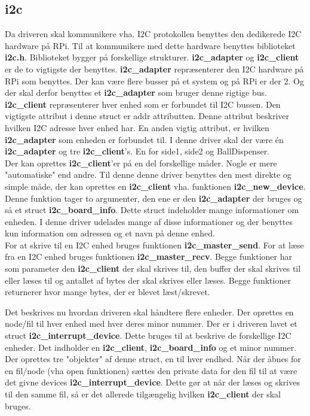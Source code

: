 \documentclass[Softwaredesign/Softwaredesign_main.tex]{subfiles}
\begin{document}
\subsection{i2c}
Da driveren skal kommunikere vha. I2C protokollen benyttes den dedikerede I2C hardware på RPi. Til at kommunikere med dette hardware benyttes biblioteket \textbf{i2c.h}. Biblioteket bygger på forskellige strukturer. \textbf{i2c\_adapter} og\textbf{ i2c\_client} er de to vigtigste der benyttes. 
\textbf{i2c\_adapter} repræsenterer den I2C hardware på RPi som benyttes. Der kan være flere busser på et system og på RPi er der 2. Og der skal derfor benyttes et \textbf{i2c\_adapter} som bruger denne rigtige bus. 
\textbf{i2c\_client} repræsenterer hver enhed som er forbundet til I2C bussen. Den vigtigste attribut i denne struct er addr attributten. Denne attribut beskriver hvilken I2C adresse hver enhed har. En anden vigtig attribut, er hvilken \textbf{i2c\_adapter} som enheden er forbundet til.
I denne driver skal der være én \textbf{i2c\_adapter} og tre \textbf{i2c\_client}'s. En for side1, side2 og BallDispenser. \\
Der kan oprettes \textbf{i2c\_client}'er på en del forskellige måder. Nogle er mere "automatiske" end andre. Til denne denne driver benyttes den mest direkte og simple måde, der kan oprettes en \textbf{i2c\_client} vha. funktionen \textbf{i2c\_new\_device}. Denne funktion tager to argumenter, den ene er den \textbf{i2c\_adapter} der bruges og så et struct \textbf{i2c\_board\_info}. Dette struct indeholder mange informationer om enheden. I denne driver udelades mange af disse informationer og der benyttes kun information om adressen og et navn på denne enhed.\\
For at skrive til en I2C enhed bruges funktionen \textbf{i2c\_master\_send}. For at læse fra en I2C enhed bruges funktionen \textbf{i2c\_master\_recv}. Begge funktioner har som parameter den\textbf{ i2c\_client} der skal skrives til, den buffer der skal skrives til eller læses til og antallet af bytes der skal skrives eller læses. Begge funktioner returnerer hvor mange bytes, der er blevet læst/skrevet.

Det beskrives nu hvordan driveren skal håndtere flere enheder. Der oprettes en node/fil til hver enhed med hver deres minor nummer.
Der er i driveren lavet et struct \textbf{i2c\_interrupt\_device}. Dette bruges til at beskrive de forskellige I2C enheder. Det indholder en \textbf{i2c\_client}, \textbf{i2c\_board\_info} og et minor nummer. Der oprettes tre "objekter" af denne struct, en til hver endhed. Når der åbnes for en fil/node (vha open funktionen) sættes den private data for den fil til at være det givne devices \textbf{i2c\_interrupt\_device}. Dette gør at når der læses og skrives til den samme fil, så er det allerede tilgængelig hvilken \textbf{i2c\_client} der skal bruges.
\end{document}
